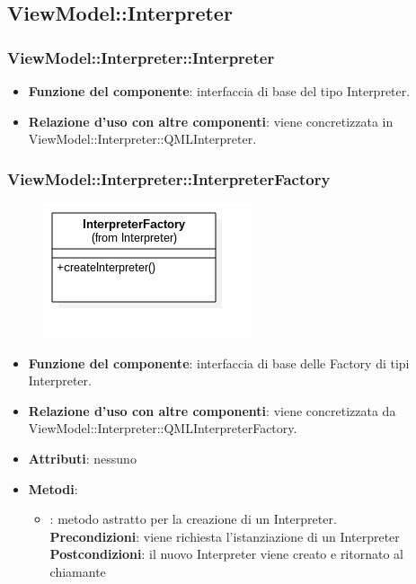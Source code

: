 \subsection{ViewModel::Interpreter}
\subsubsection{ViewModel::Interpreter::Interpreter}
\begin{itemize}
\item\textbf{Funzione del componente}: interfaccia di base del tipo Interpreter.
	\item\textbf{Relazione d'uso con altre componenti}: viene concretizzata in\\ ViewModel::Interpreter::QMLInterpreter.\\
\end{itemize}
\subsubsection{ViewModel::Interpreter::InterpreterFactory}
\begin{figure}[h!]
\begin{center}
	\includegraphics[scale=0.4]{../images/ViewModel/Interpreter/InterpreterFactory.png}
\end{center}
\end{figure}
\begin{itemize}
\item\textbf{Funzione del componente}: interfaccia di base delle Factory di tipi Interpreter.
	\item\textbf{Relazione d'uso con altre componenti}: viene concretizzata da\\ ViewModel::Interpreter::QMLInterpreterFactory.\\ 
\item\textbf{Attributi}: nessuno
\item\textbf{Metodi}:
	\begin{itemize}
		\item{}: metodo astratto per la creazione di un Interpreter.\\
		\textbf{Precondizioni}: viene richiesta l'istanziazione di un Interpreter\\
		\textbf{Postcondizioni}: il nuovo Interpreter viene creato e ritornato al chiamante\\
	\end{itemize}
\end{itemize}

